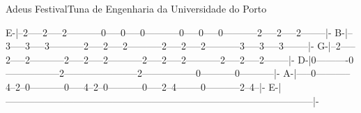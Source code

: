 \begin{musica}{Adeus Festival}{Tuna de Engenharia da Universidade do Porto}{}
\begin{tablatura}
E-|--2-----2-----2-----------0-----0-----0-----------0-----0-----0-----------2-----2-----2--------|-
B-|--3-----3-----3-----------2-----2-----2-----------2-----2-----2-----------3-----3-----3--------|-
G-|--2-----2-----2-----------2-----2-----2-----------2-----2-----2-----------2-----2-----2--------|-  
D-|0----------0-----------------2-----------------------2-----------------0-----------0-----------|-
A-|-----0-----------4--2--0-----------0-----4--2--0-----------0-----2--4--------0-----------2--4--|-
E-|-----------------------------------------------------------------------------------------------|-
\end{tablatura}





\end{musica}
